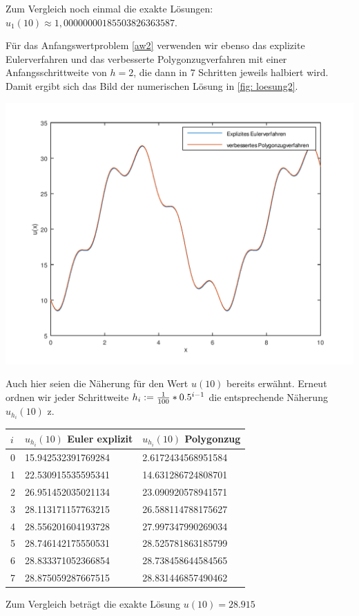 \documentclass[ %
ngerman, %
a4paper, %
12pt, %
sectionreset, %
chapterstyle=framed, %
sectionstyle=dotted, %
titlefont=osfamily %
]{../../../../texmf/tex/latex/mathscriptMathTUD/mathscriptMathTUD}
\newcommand*\head{\rowfont{\bfseries}}
\begin{document}
	\smallskip

	Zum Vergleich noch einmal die exakte Lösungen: $u_1(10) \approx 1,00000000185503826363587$.
	
	Für das Anfangswertproblem \eqref{aw2} verwenden wir ebenso das explizite Eulerverfahren und das verbesserte Polygonzugverfahren mit einer Anfangsschrittweite von $h=2$, die dann in $7$ Schritten jeweils halbiert wird. Damit ergibt sich das Bild der numerischen Lösung in \cref{fig: loesung2}.
	
	\begin{center}
		\includegraphics[width=.65\textwidth]{./loesung2.png}
		\label{fig: loesung2}
	\end{center}

	Auch hier seien die Näherung für den Wert $u(10)$ bereits erwähnt. Erneut ordnen wir jeder Schrittweite $h_i \mathrel{:=} \frac{1}{100} * 0.5^{i-1}$ die entsprechende Näherung $u_{h_i}(10)$ z.
	\begin{center}
		\begin{tabu}{l|l|l}
			\toprule
			\head $i$ & $u_{h_i}(10)$ Euler explizit & $u_{h_i}(10)$ Polygonzug\\
			\midrule {} & 15.942532391769284 & 2.6172434568951584 \\
			1 & 22.530915535595341 & 14.631286724808701 \\
			2 & 26.951452035021134 & 23.090920578941571 \\
			3 & 28.113171157763215 & 26.588114788175627 \\
			4 & 28.556201604193728 & 27.997347990269034 \\
			5 & 28.746142175550531 & 28.525781863185799 \\
			6 & 28.833371052366854 & 28.738458644584565 \\
			7 & 28.875059287667515 & 28.831446857490462 \\
			\bottomrule
		\end{tabu}
		\label{tab: expeu_2}
	\end{center}
	Zum Vergleich beträgt die exakte Lösung $u(10) = 28.915$
\end{document}
